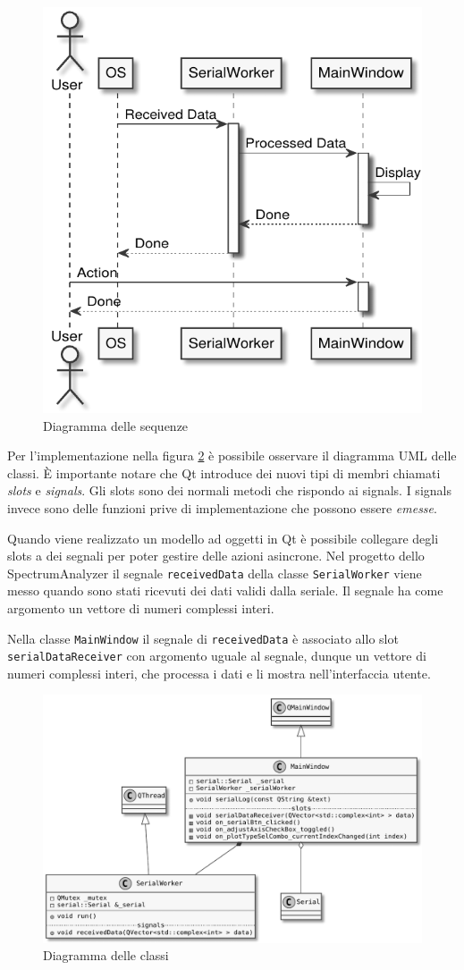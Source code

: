 \begin{figure}[H] \centering
    \includegraphics[width=.6\textwidth]{figures/uml/desktop-sequence}
    \caption{Diagramma delle sequenze \label{fig:desktop-sequence}}
\end{figure}

Per l'implementazione nella figura \ref{fig:desktop-classes} \`e possibile
osservare il diagramma UML delle classi. \`E importante notare che Qt 
introduce dei nuovi tipi di membri chiamati \emph{slots} e \emph{signals}.
Gli slots sono dei normali metodi che rispondo ai signals. I signals invece
sono delle funzioni prive di implementazione che possono essere \emph{emesse}.

Quando viene realizzato un modello ad oggetti in Qt \`e possibile collegare
degli slots a dei segnali per poter gestire delle azioni asincrone.  Nel
progetto dello SpectrumAnalyzer il segnale \texttt{receivedData} della classe
\texttt{SerialWorker} viene messo quando sono stati ricevuti dei dati validi
dalla seriale. Il segnale ha come argomento un vettore di numeri complessi
interi.

Nella classe \texttt{MainWindow} il segnale di \texttt{receivedData} \`e
associato allo slot \texttt{serialDataReceiver} con argomento uguale al
segnale, dunque un vettore di numeri complessi interi, che processa i dati e li
mostra nell'interfaccia utente.

\begin{figure}[H] \centering
    \includegraphics[width=\textwidth]{figures/uml/desktop-classes}
    \caption{Diagramma delle classi \label{fig:desktop-classes}}
\end{figure}


